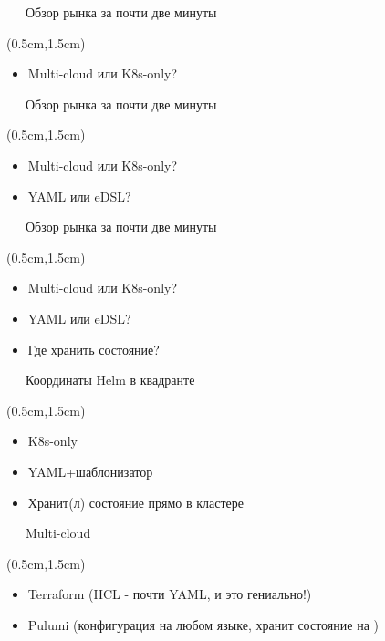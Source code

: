\documentclass[xetex,18pt,aspectratio=43]{beamer}
\begin{document}
\begin{Large}
\begin{frame}{\ \ \ Обзор рынка за почти две минуты}
\begin{textblock*}{\framewidth-0.8cm}(0.5cm,1.5cm)
\begin{itemize}
  \item Multi-cloud или K8s-only?
\end{itemize}
\end{textblock*}
\end{frame}

\begin{frame}{\ \ \ Обзор рынка за почти две минуты}
\begin{textblock*}{\framewidth-0.8cm}(0.5cm,1.5cm)
\begin{itemize}
  \item Multi-cloud или K8s-only?
  \item YAML или eDSL?
\end{itemize}
\end{textblock*}
\end{frame}

\begin{frame}{\ \ \ Обзор рынка за почти две минуты}
\begin{textblock*}{\framewidth-0.8cm}(0.5cm,1.5cm)
\begin{itemize}
  \item Multi-cloud или K8s-only?
  \item YAML или eDSL?
  \item Где хранить состояние?
\end{itemize}
\end{textblock*}
\end{frame}

\begin{frame}{\ \ \ Координаты Helm в квадранте}
\begin{textblock*}{\framewidth-0.8cm}(0.5cm,1.5cm)
\begin{itemize}
  \item K8s-only
  \item YAML+шаблонизатор
  \item Хранит(л) состояние прямо в кластере
\end{itemize}
\end{textblock*}
\end{frame}

\begin{frame}{\ \ \ Multi-cloud}
\begin{textblock*}{\framewidth-0.8cm}(0.5cm,1.5cm)
\begin{itemize}
  \item Terraform (HCL - почти YAML, и это гениально!)
  \item Pulumi (конфигурация на любом языке, хранит состояние на \href{https://app.pulumi.com}{\color{blue}{app.pulumi.com}})
\end{itemize}
\end{textblock*}
\end{frame}


\end{Large}
\end{document}

